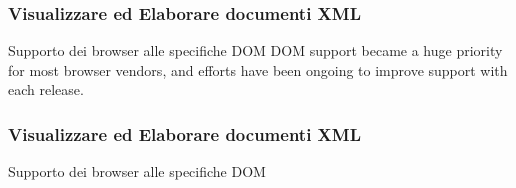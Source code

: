 \begin{frame}
    \frametitle{Visualizzare ed Elaborare documenti XML}
    \addtocounter{nframe}{1}
    

     \begin{block}{Supporto dei browser alle specifiche DOM}
        DOM support became a huge priority for most browser vendors, and efforts have been ongoing to improve support with each release.
     \end{block}
     
\end{frame}


\begin{frame}
    \frametitle{Visualizzare ed Elaborare documenti XML}
    \addtocounter{nframe}{1}
    

     \begin{block}{Supporto dei browser alle specifiche DOM}
        
     \end{block}
     
\end{frame}


